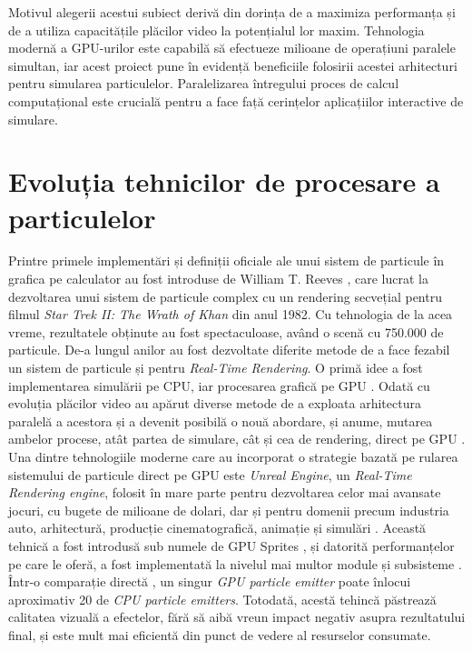 Motivul alegerii acestui subiect derivă din dorința de a maximiza performanța și de a utiliza capacitățile plăcilor video la potențialul lor maxim. Tehnologia modernă a GPU-urilor este capabilă să efectueze milioane de operațiuni paralele simultan, iar acest proiect pune în evidență beneficiile folosirii acestei arhitecturi pentru simularea particulelor. Paralelizarea întregului proces de calcul computațional este crucială pentru a face față cerințelor aplicațiilor interactive de simulare. 

\section{Evoluția tehnicilor de procesare a particulelor}
Printre primele implementări și definiții oficiale ale unui sistem de particule în grafica pe calculator au fost introduse de William T. Reeves \cite{ParticleSystemDefinition_citation}, care lucrat la dezvoltarea unui sistem de particule complex cu un rendering secvețial pentru filmul \textit{Star Trek II: The Wrath of Khan} din anul 1982. Cu tehnologia de la acea vreme, rezultatele obținute au fost spectaculoase, având o scenă cu 750.000 de particule. De-a lungul anilor au fost dezvoltate diferite metode de a face fezabil un sistem de particule și pentru \textit{Real-Time Rendering}. O primă idee a fost implementarea simulării pe CPU, iar procesarea grafică pe GPU \cite{CPUParticleSystem_citation}. Odată cu evoluția plăcilor video au apărut diverse metode de a exploata arhitectura paralelă a acestora și a devenit posibilă o nouă abordare, și anume, mutarea ambelor procese, atât partea de simulare, cât și cea de rendering, direct pe GPU \cite{GPUParticleSystem_citation}. Una dintre tehnologiile moderne care au incorporat o strategie bazată pe rularea sistemului de particule direct pe GPU este \textit{Unreal Engine}, un \textit{Real-Time Rendering engine}, folosit în mare parte pentru dezvoltarea celor mai avansate jocuri, cu bugete de milioane de dolari, dar și pentru domenii precum industria auto, arhitectură, producție cinematografică, animație și simulări \cite{UnrealEngine_citation}. Această tehnică a fost introdusă sub numele de GPU Sprites \cite{UnrealEngineGPUSprites_citation}, și datorită performanțelor pe care le oferă, a fost implementată la nivelul mai multor module și subsisteme \cite{UnrealEngineGPUSpritesNiagara_citation}. Într-o comparație directă \cite{ParticleEffectsUE4_citation}, un singur \textit{GPU particle emitter} poate înlocui aproximativ 20 de \textit{CPU particle emitters}. Totodată, acestă tehincă păstrează calitatea vizuală a efectelor, fără să aibă vreun impact negativ asupra rezultatului final, și este mult mai eficientă din punct de vedere al resurselor consumate. 

